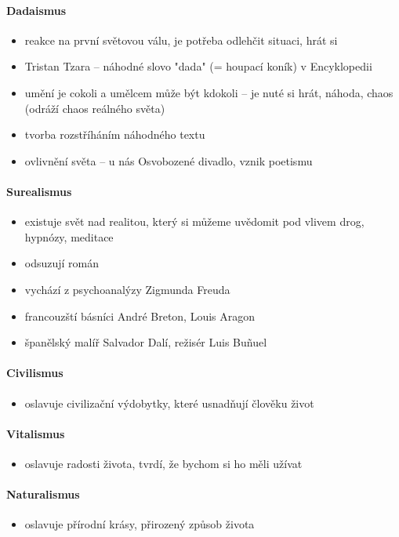\paragraph{Dadaismus}
\begin{itemize}
\item reakce na první světovou válu, je potřeba odlehčit situaci, hrát si
\item Tristan Tzara -- náhodné slovo "dada" (= houpací koník) v Encyklopedii
\item umění je cokoli a umělcem může být kdokoli -- je nuté si hrát, náhoda, chaos (odráží chaos reálného světa)
\item tvorba rozstříháním náhodného textu
\item ovlivnění světa -- u nás Osvobozené divadlo, vznik poetismu
\end{itemize}


\paragraph{Surealismus}
\begin{itemize}
\item existuje svět nad realitou, který si můžeme uvědomit pod vlivem drog, hypnózy, meditace
\item odsuzují román
\item vychází z psychoanalýzy Zigmunda Freuda
\item francouzští básníci André Breton, Louis Aragon
\item španělský malíř Salvador Dalí, režisér Luis Buñuel
\end{itemize}

\paragraph{Civilismus}
\begin{itemize}
\item oslavuje civilizační výdobytky, které usnadňují člověku život
\end{itemize}

\paragraph{Vitalismus}
\begin{itemize}
\item oslavuje radosti života, tvrdí, že bychom si ho měli užívat
\end{itemize}

\paragraph{Naturalismus}
\begin{itemize}
\item oslavuje přírodní krásy, přirozený způsob života
\end{itemize}

